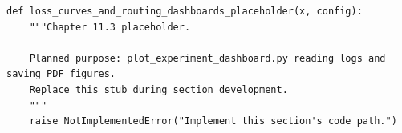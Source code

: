 \begin{lstlisting}[style=bookpython,caption={Planned code placeholder for loss curves and routing dashboards.},label={lst:ch11-loss-curves-and-routing-dashboards}]
def loss_curves_and_routing_dashboards_placeholder(x, config):
    """Chapter 11.3 placeholder.

    Planned purpose: plot_experiment_dashboard.py reading logs and saving PDF figures.
    Replace this stub during section development.
    """
    raise NotImplementedError("Implement this section's code path.")
\end{lstlisting}
